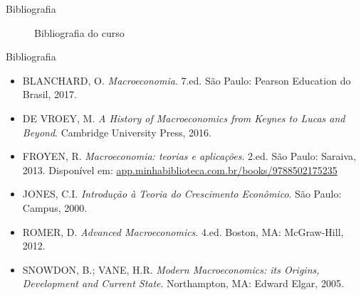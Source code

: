 \documentclass[10pt]{beamer}
\begin{document}
\begin{frame}{Bibliografia}
    \begin{figure}
        \centering
         \qquad
         \qquad
        \caption{Bibliografia do curso}
        \label{fig1}
    \end{figure}
\end{frame}

\begin{frame}{Bibliografia}
    \begin{itemize}
        \item BLANCHARD, O. \emph{Macroeconomia}. 7.ed. São Paulo: Pearson Education do Brasil, 2017.\medskip
        \item DE VROEY, M. \emph{A History of Macroeconomics from Keynes to Lucas and Beyond}. Cambridge University Press, 2016.\medskip
        \item FROYEN, R. \emph{Macroeconomia: teorias e aplicações}. 2.ed. São Paulo: Saraiva, 2013. Disponível em: \href{https://app.minhabiblioteca.com.br/books/9788502175235}{app.minhabiblioteca.com.br/books/9788502175235}\medskip
        \item JONES, C.I. \emph{Introdução à Teoria do Crescimento Econômico}. São Paulo: Campus, 2000.\medskip
        \item ROMER, D. \emph{Advanced Macroeconomics}. 4.ed. Boston, MA: McGraw-Hill, 2012.\medskip
        \item SNOWDON, B.; VANE, H.R. \emph{Modern Macroeconomics: its Origins, Development and Current State}. Northampton, MA: Edward Elgar, 2005.
    \end{itemize}
\end{frame}
\end{document}
